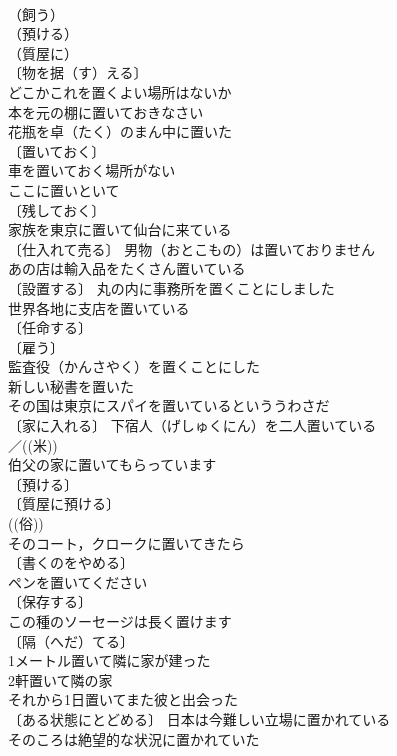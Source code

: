 \documentclass[8pt]{extreport}
\begin{document}
\begin{CJK}{UTF8}{min}
\\	（飼う）
\\	（預ける）
\\	（質屋に）
\\	〔物を据（す）える〕
\\	どこかこれを置くよい場所はないか 
\\	本を元の棚に置いておきなさい 
\\	花瓶を卓（たく）のまん中に置いた 
\\	〔置いておく〕
\\	車を置いておく場所がない 
\\	ここに置いといて 
\\	〔残しておく〕
\\	家族を東京に置いて仙台に来ている 
\\	〔仕入れて売る〕 男物（おとこもの）は置いておりません 
\\	あの店は輸入品をたくさん置いている 
\\	〔設置する〕 丸の内に事務所を置くことにしました 
\\	世界各地に支店を置いている 
\\	〔任命する〕
\\	〔雇う〕
\\	監査役（かんさやく）を置くことにした 
\\	新しい秘書を置いた 
\\	その国は東京にスパイを置いているといううわさだ 
\\	〔家に入れる〕 下宿人（げしゅくにん）を二人置いている 
\\	／((米)) 
\\	伯父の家に置いてもらっています 
\\	〔預ける〕
\\	〔質屋に預ける〕
\\	((俗)) 
\\	そのコート，クロークに置いてきたら 
\\	〔書くのをやめる〕 
\\	ペンを置いてください 
\\	〔保存する〕
\\	この種のソーセージは長く置けます 
\\	〔隔（へだ）てる〕　
\\	1メートル置いて隣に家が建った 
\\	2軒置いて隣の家 
\\	それから1日置いてまた彼と出会った 
\\	〔ある状態にとどめる〕 日本は今難しい立場に置かれている 
\\	そのころは絶望的な状況に置かれていた 

\end{CJK}
\end{document}

